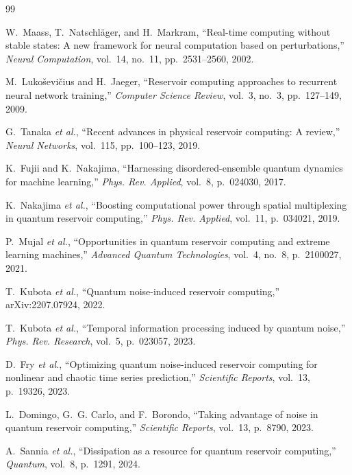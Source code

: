 
\begin{thebibliography}{99}

W.~Maass, T.~Natschl\"ager, and H.~Markram, ``Real-time computing without stable states: A new framework for neural computation based on perturbations,'' \emph{Neural Computation}, vol.~14, no.~11, pp.~2531--2560, 2002.

M.~Luko\v{s}evi\v{c}ius and H.~Jaeger, ``Reservoir computing approaches to recurrent neural network training,'' \emph{Computer Science Review}, vol.~3, no.~3, pp.~127--149, 2009.

G.~Tanaka \emph{et al.}, ``Recent advances in physical reservoir computing: A review,'' \emph{Neural Networks}, vol.~115, pp.~100--123, 2019.

K.~Fujii and K.~Nakajima, ``Harnessing disordered-ensemble quantum dynamics for machine learning,'' \emph{Phys. Rev. Applied}, vol.~8, p.~024030, 2017.

K.~Nakajima \emph{et al.}, ``Boosting computational power through spatial multiplexing in quantum reservoir computing,'' \emph{Phys. Rev. Applied}, vol.~11, p.~034021, 2019.

P.~Mujal \emph{et al.}, ``Opportunities in quantum reservoir computing and extreme learning machines,'' \emph{Advanced Quantum Technologies}, vol.~4, no.~8, p.~2100027, 2021.

T.~Kubota \emph{et al.}, ``Quantum noise-induced reservoir computing,'' arXiv:2207.07924, 2022.

T.~Kubota \emph{et al.}, ``Temporal information processing induced by quantum noise,'' \emph{Phys. Rev. Research}, vol.~5, p.~023057, 2023.

D.~Fry \emph{et al.}, ``Optimizing quantum noise-induced reservoir computing for nonlinear and chaotic time series prediction,'' \emph{Scientific Reports}, vol.~13, p.~19326, 2023.

L.~Domingo, G.~G. Carlo, and F.~Borondo, ``Taking advantage of noise in quantum reservoir computing,'' \emph{Scientific Reports}, vol.~13, p.~8790, 2023.

A.~Sannia \emph{et al.}, ``Dissipation as a resource for quantum reservoir computing,'' \emph{Quantum}, vol.~8, p.~1291, 2024.


\end{thebibliography}
